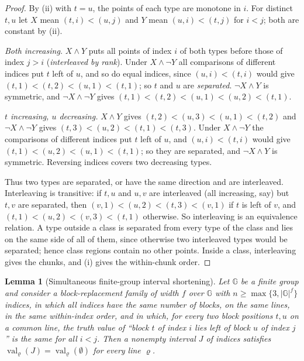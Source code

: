 \documentclass[11pt]{article}
\numberwithin{equation}{section}
\theoremstyle{plain}
\newtheorem{lemma}[theorem]{Lemma}
\theoremstyle{definition}
\theoremstyle{remark}
\begin{document}
\begin{proof}
By (ii) with $t=u$, the points of each type are monotone in $i$.  For distinct
$t,u$ let $X$ mean $(t,i)<(u,j)$ and $Y$ mean $(u,i)<(t,j)$ for $i<j$; both are
constant by (ii).

\emph{Both increasing.}  $X\wedge Y$ puts all points of index $i$ of both types
before those of index $j>i$ (\emph{interleaved by rank}).  Under $X\wedge\neg Y$
all comparisons of different indices put $t$ left of $u$, and so do equal indices,
since $(u,i)<(t,i)$ would give $(t,1)<(t,2)<(u,1)<(t,1)$; so $t$ and $u$ are
\emph{separated}.  $\neg X\wedge Y$ is symmetric, and $\neg X\wedge\neg Y$ gives
$(t,1)<(t,2)<(u,1)<(u,2)<(t,1)$.

\emph{$t$ increasing, $u$ decreasing.}  $X\wedge Y$ gives
$(t,2)<(u,3)<(u,1)<(t,2)$ and $\neg X\wedge\neg Y$ gives
$(t,3)<(u,2)<(t,1)<(t,3)$.  Under $X\wedge\neg Y$ the comparisons of different
indices put $t$ left of $u$, and $(u,i)<(t,i)$ would give
$(t,1)<(u,2)<(u,1)<(t,1)$; so they are separated, and $\neg X\wedge Y$ is
symmetric.  Reversing indices covers two decreasing types.

Thus two types are separated, or have the same direction and are interleaved.
Interleaving is transitive: if $t,u$ and $u,v$ are interleaved (all increasing,
say) but $t,v$ are separated, then $(v,1)<(u,2)<(t,3)<(v,1)$ if $t$ is left of $v$,
and $(t,1)<(u,2)<(v,3)<(t,1)$ otherwise.  So interleaving is an equivalence
relation.  A type outside a class is separated from every type of the class and
lies on the same side of all of them, since otherwise two interleaved types would
be separated; hence class regions contain no other points.  Inside a class,
interleaving gives the chunks, and (i) gives the within-chunk order.
\end{proof}

\begin{lemma}[Simultaneous finite-group interval shortening]
\label{lem:group-interval}
Let ${\mathbb G}$ be a finite group and consider a block-replacement family of width $f$
over ${\mathbb G}$ with $n\ge\max\{3,|{\mathbb G}|^f\}$ indices, in which all indices have the same
number of blocks, on the same lines, in the same within-index order, and in which,
for every two block positions $t,u$ on a common line, the truth value of
``block $t$ of index $i$ lies left of block $u$ of index $j$'' is the same for all
$i<j$.  Then a nonempty interval $J$ of indices satisfies
$\operatorname{val}_\varrho(J)=\operatorname{val}_\varrho(\emptyset)$ for every line $\varrho$.
\end{lemma}
\end{document}
